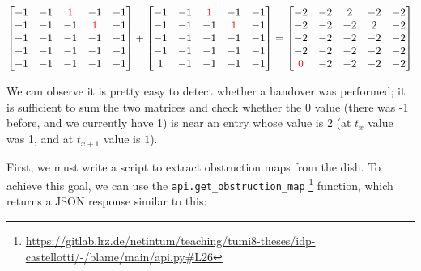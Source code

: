 \documentclass[IN,11pt,twoside,openright,idp,english]{tumthesis}
\begin{document}
$\begin{bmatrix}
-1 & -1 & \color{red}1 &           -1 & -1 \\
-1 & -1 &           -1 & \color{red}1 & -1 \\
-1 & -1 &           -1 &           -1 & -1 \\
-1 & -1 &           -1 &           -1 & -1 \\
-1 & -1 &           -1 &           -1 & -1 \\
\end{bmatrix}
+
\begin{bmatrix}
-1 & -1 & \color{red}1 &           -1 & -1 \\
-1 & -1 &           -1 & \color{red}1 & -1 \\
-1 & -1 &           -1 &           -1 & -1 \\
-1 & -1 &           -1 &           -1 & -1 \\
1 & -1 &            -1 &           -1 & -1 \\
\end{bmatrix}
=
\begin{bmatrix}
          -2 & -2 & 2 & -2 & -2 \\
          -2 & -2 & -2 & 2 & -2 \\
          -2 & -2 & -2 & -2 & -2 \\
          -2 & -2 & -2 & -2 & -2 \\
\color{red}0 & -2 & -2 & -2 & -2 \\
\end{bmatrix}$

\vspace{10mm}

We can observe it is pretty easy to detect whether a handover was performed; it is sufficient to sum the two matrices
and check whether the $ 0 $ value (there was -1 before, and we currently have 1) is near an entry whose value is $ 2 $
(at $ t_{x} $ value was 1, and at $ t_{x+1} $ value is $ 1 $). 

First, we must write a script to extract obstruction maps from the dish. To achieve this goal, we can use the
\texttt{api.get\_obstruction\_map}
\footnote{\url{https://gitlab.lrz.de/netintum/teaching/tumi8-theses/idp-castellotti/-/blame/main/api.py\#L26}}
function, which returns a JSON response similar to this:
\end{document}
